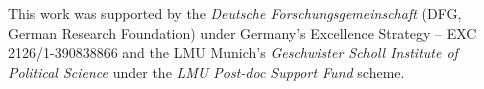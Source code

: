 This work was supported by
the \textit{Deutsche Forschungsgemeinschaft} (DFG, German Research Foundation) under Germany's Excellence Strategy – EXC 2126/1-390838866
and
the LMU Munich's \textit{Geschwister Scholl Institute of Political Science} under the \textit{LMU Post-doc Support Fund} scheme.
